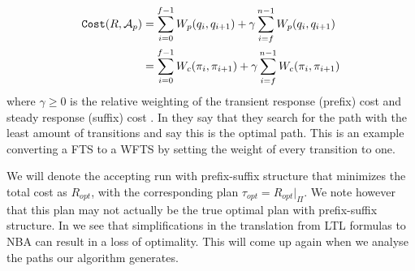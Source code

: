 \begin{align*}
\texttt{Cost} (R, \mathcal{A}_p) &= \sum_{i=0}^{f-1} W_p(q_i,q_{i+1}) + \gamma \sum_{i=f}^{n-1} W_p(q_i,q_{i+1}) \\
&= \sum_{i=0}^{f-1} W_c(\pi_i,\pi_{i+1}) + \gamma \sum_{i=f}^{n-1} W_c(\pi_i, \pi_{i+1})
\end{align*}
where $\gamma \geq 0$ is the relative weighting of the transient response (prefix) cost and steady response (suffix) cost \cite{guo15}. In \cite{fainekos09} they say that they search for the path with the least amount of transitions and say this is the optimal path. This is an example converting a FTS to a WFTS by setting the weight of every transition to one.
 


We will denote the accepting run with prefix-suffix structure that minimizes the total cost as $R_{opt}$, with the corresponding plan $\tau_{opt} = R_{opt}|_\Pi$. We note however that this plan may not actually be the true optimal plan with prefix-suffix structure. In \cite{schuppan05} we see that simplifications in the translation from LTL formulas to NBA can result in a loss of optimality. This will come up again when we analyse the paths our algorithm generates. 
